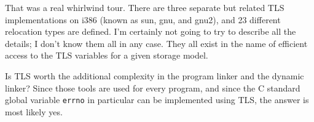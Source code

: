 That was a real whirlwind tour. There are three separate but related TLS
implementations on i386 (known as sun, gnu, and gnu2), and 23 different
relocation types are defined. I'm certainly not going to try to describe all
the details; I don't know them all in any case. They all exist in the name of
efficient access to the TLS variables for a given storage model.

Is TLS worth the additional complexity in the program linker and the dynamic
linker? Since those tools are used for every program, and since the C standard
global variable \texttt{errno} in particular can be implemented using TLS, the
answer is most likely yes.
